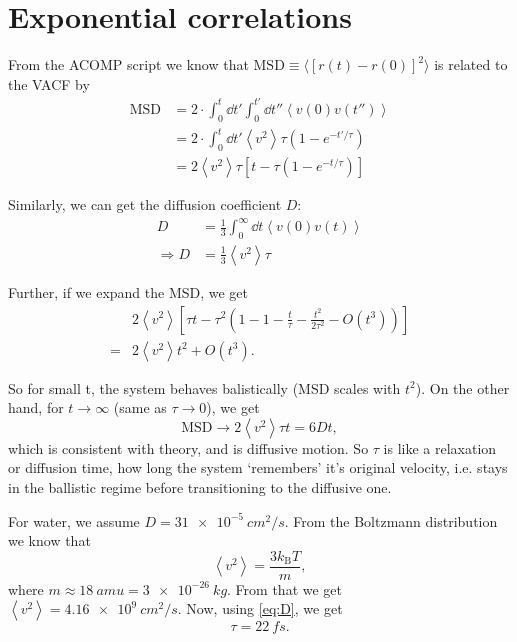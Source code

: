 \documentclass[11pt]{article}
\newcommand{\sub}[1]{_{\text{#1}}}
\begin{document}
\newcommand\mean[1]{\left\langle#1\right\rangle}


\section{Exponential correlations}

From the ACOMP script we know that $\text{MSD} \equiv \langle[r(t) - r(0)]^2\rangle$ is related to the VACF by
\begin{align}
	\text{MSD} &= 2\cdot \int_0^t \dd{t'} \int_0^{t'} \dd{t''} \mean{v(0) v(t'')}\\
	&= 2\cdot \int_0^t \dd{t'} \mean{v^2} \tau\left(1-e^{-t'/\tau}\right)\\
	&= 2 \mean{v^2} \tau\left[t - \tau\left(1-e^{-t/\tau}\right)\right]
\end{align}

Similarly, we can get the diffusion coefficient $D$:
\begin{align}
	D &= \frac13\int_0^\infty \dd{t} \mean{v(0)v(t)}\\
	\Rightarrow D &= \frac13 \mean{v^2} \tau \label{eq:D}
\end{align}

Further, if we expand the MSD, we get
\begin{align}
	&2\mean{v^2}\left[\tau t - \tau^2 \left(1-1-\frac t\tau - \frac{t^2}{2\tau^2} - O(t^3)\right)\right]\\
	= &2\mean{v^2}t^2 + O(t^3).
\end{align}

So for small t, the system behaves balistically (MSD scales with $t^2$).
On the other hand, for $t\rightarrow\infty$  (same as $\tau\rightarrow 0$), we get
\begin{equation}
	\text{MSD} \rightarrow 2\mean{v^2}\tau t = 6Dt,
\end{equation}
which is consistent with theory, and is diffusive motion.
So $\tau$ is like a relaxation or diffusion time, how long the system `remembers' it's original velocity, i.e. stays in the ballistic regime before transitioning to the diffusive one.

For water, we assume $D = \SI{31e-5}{cm^2/s}$. From the Boltzmann distribution we know that
\begin{equation}
	\mean{v^2} = \frac{3 k\sub B T}{m},
\end{equation}
where $m \approx \SI{18}{amu} = \SI{3e-26}{kg}$.
From that we get $\mean{v^2} = \SI{4.16e9}{cm^2/s}$.
Now, using \autoref{eq:D}, we get
\begin{equation*}
	\tau = \SI{22}{fs}.
\end{equation*}
\end{document}
